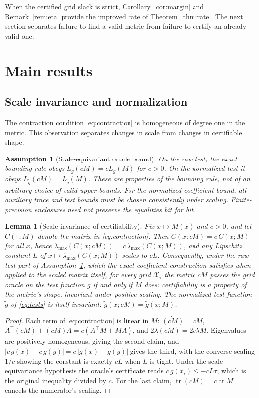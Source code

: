 \documentclass[12pt,onecolumn,journal]{IEEEtran}
\newtheorem{lemma}{Lemma}
\newtheorem{assumption}{Assumption}
\newcommand{\X}{\mathcal{X}}
\newcommand{\lmax}{\lambda_{\max}}
\providecommand{\tr}{}
\renewcommand{\tr}{\operatorname{tr}}
\begin{document}
When the certified grid slack is strict, Corollary~\ref{cor:margin} and Remark~\ref{rem:eta} provide the improved rate of Theorem~\ref{thm:rate}. The next section separates failure to find a valid metric from failure to certify an already valid one.

\section{Main results}
\label{sec:results}

\subsection{Scale invariance and normalization}

The contraction condition \eqref{eq:contraction} is homogeneous of degree one in the metric. This observation separates changes in scale from changes in certifiable shape.

\begin{assumption}[Scale-equivariant oracle bound]
\label{ass:scale}
On the raw test, the exact bounding rule obeys $L_g(cM)=cL_g(M)$ for $c>0$. On the normalized test it obeys $L_{\tilde g}(cM)=L_{\tilde g}(M)$. These are properties of the bounding rule, not of an arbitrary choice of valid upper bounds. For the normalized coefficient bound, all auxiliary trace and test bounds must be chosen consistently under scaling. Finite-precision enclosures need not preserve the equalities bit for bit.
\end{assumption}

\begin{lemma}[Scale invariance of certifiability]
\label{lem:scale}
Fix $x \mapsto M(x)$ and $c > 0$, and let $C(\cdot\,; M)$ denote the matrix in \eqref{eq:contraction}. Then $C(x; cM) = c\, C(x; M)$ for all $x$, hence $\lmax(C(x; cM)) = c\,\lmax(C(x; M))$, and any Lipschitz constant $L$ of $x \mapsto \lmax(C(x;M))$ scales to $cL$. Consequently, under the raw-test part of Assumption~\ref{ass:scale}, which the exact coefficient construction satisfies when applied to the scaled matrix itself, for every grid $\X_\tau$ the metric $cM$ passes the grid oracle on the test function $g$ if and only if $M$ does: certifiability is a property of the metric's shape, invariant under positive scaling. The normalized test function $\tilde g$ of \eqref{eq:tests} is itself invariant: $\tilde g(x; cM) = \tilde g(x; M)$.
\end{lemma}

\begin{proof}
Each term of \eqref{eq:contraction} is linear in $M$: $\dot{(cM)} = c\dot M$, $A^\top (cM) + (cM) A = c(A^\top M + MA)$, and $2\lambda (cM) = 2c\lambda M$. Eigenvalues are positively homogeneous, giving the second claim, and $|c\,g(x) - c\,g(y)| = c\,|g(x) - g(y)|$ gives the third, with the converse scaling $1/c$ showing the constant is exactly $cL$ when $L$ is tight. Under the scale-equivariance hypothesis the oracle's certificate reads $c\,g(x_i) \le -cL\tau$, which is the original inequality divided by $c$. For the last claim, $\tr(cM) = c \tr M$ cancels the numerator's scaling.
\end{proof}
\end{document}
